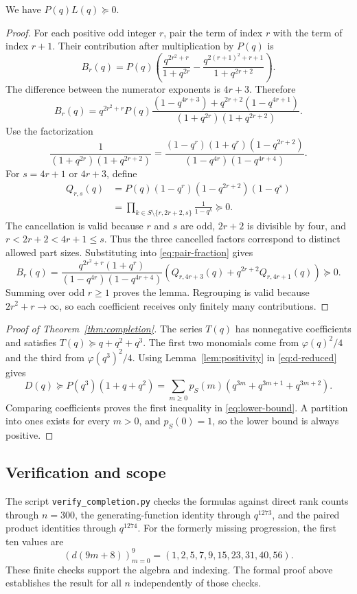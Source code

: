 \begin{lemma}\label{lem:positivity}
We have $P(q)L(q)\succeq0$.
\end{lemma}
\begin{proof}
For each positive odd integer $r$, pair the term of index $r$ with the
term of index $r+1$. Their contribution after multiplication by $P(q)$ is
\[
 B_r(q)=P(q)\left(
 \frac{q^{2r^2+r}}{1+q^{2r}}
 -\frac{q^{2(r+1)^2+r+1}}{1+q^{2r+2}}
 \right).
\]
The difference between the numerator exponents is $4r+3$. Therefore
\begin{equation}\label{eq:pair-fraction}
 B_r(q)=q^{2r^2+r}P(q)
 \frac{(1-q^{4r+3})+q^{2r+2}(1-q^{4r+1})}
 {(1+q^{2r})(1+q^{2r+2})}.
\end{equation}
Use the factorization
\[
 \frac1{(1+q^{2r})(1+q^{2r+2})}
 =\frac{(1-q^r)(1+q^r)(1-q^{2r+2})}
 {(1-q^{4r})(1-q^{4r+4})}.
\]
For $s=4r+1$ or $4r+3$, define
\begin{align*}
 Q_{r,s}(q)
 &=P(q)(1-q^r)(1-q^{2r+2})(1-q^s)\\
 &=\prod_{k\in S\setminus\{r,2r+2,s\}}\frac1{1-q^k}\succeq0.
\end{align*}
The cancellation is valid because $r$ and $s$ are odd, $2r+2$ is divisible
by four, and $r<2r+2<4r+1\le s$. Thus the three cancelled factors
correspond to distinct allowed part sizes.
Substituting into \eqref{eq:pair-fraction} gives
\begin{equation}\label{eq:positive-pair}
 B_r(q)=\frac{q^{2r^2+r}(1+q^r)}{(1-q^{4r})(1-q^{4r+4})}
 \left(Q_{r,4r+3}(q)+q^{2r+2}Q_{r,4r+1}(q)\right)\succeq0.
\end{equation}
Summing over odd $r\ge1$ proves the lemma. Regrouping is valid because
$2r^2+r\to\infty$, so each coefficient receives only finitely many
contributions.
\end{proof}

\begin{proof}[Proof of Theorem~\ref{thm:completion}]
The series $T(q)$ has nonnegative coefficients and satisfies
$T(q)\succeq q+q^2+q^3$. The first two monomials come from
$\varphi(q)^2/4$ and the third from $\varphi(q^3)^2/4$.
Using Lemma~\ref{lem:positivity} in \eqref{eq:d-reduced} gives
\[
 D(q)\succeq P(q^3)(1+q+q^2)
 =\sum_{m\ge0}p_S(m)(q^{3m}+q^{3m+1}+q^{3m+2}).
\]
Comparing coefficients proves the first inequality in
\eqref{eq:lower-bound}. A partition into ones exists for every $m>0$,
and $p_S(0)=1$, so the lower bound is always positive.
\end{proof}

\subsection{Verification and scope}
The script \texttt{verify\_completion.py} checks the formulas against direct
rank counts through $n=300$, the generating-function identity through
$q^{1273}$, and the paired product identities through $q^{1274}$.
For the formerly missing progression, the first ten values are
\[
 (d(9m+8))_{m=0}^9=(1,2,5,7,9,15,23,31,40,56).
\]
These finite checks support the algebra and indexing. The formal proof
above establishes the result for all $n$ independently of those checks.
